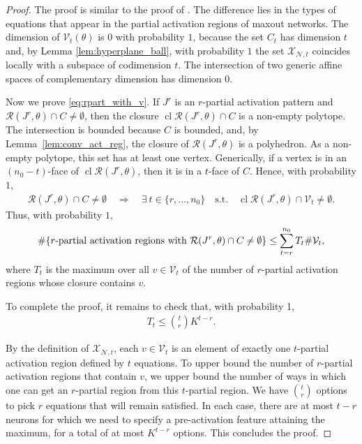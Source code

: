 \documentclass{article}
\theoremstyle{definition}
\newcommand{\net}{\mathcal{N}}
\newcommand{\nin}{n_0}
\begin{document}
\begin{proof} 
    The proof is similar to the proof of \cite[Lemma 12]{NIPS2019_8328}. The difference lies in the types of equations that appear in the partial activation regions of maxout networks.
    The dimension of $\mathcal{V}_t(\theta)$ is $0$ with probability $1$, because the set $C_t$ has dimension $t$ and, by Lemma \ref{lem:hyperplane_ball}, with probability $1$ the set $\mathcal{X}_{\net, t}$ coincides locally with a subspace of codimension $t$. 
    The intersection of two generic affine spaces of complementary dimension has dimension $0$. 
    
    Now we prove \eqref{eq:rpart_with_v}. 
    If $J^r$ is an $r$-partial activation pattern and $\mathcal{R}(J^r,\theta)\cap C\neq\emptyset$, then the closure $\operatorname{cl} \mathcal{R}(J^r,\theta) \cap C$ is a non-empty polytope.
    The intersection is bounded because $C$ is bounded, and, by Lemma~\ref{lem:conv_act_reg}, the closure of $\mathcal{R}(J^r,\theta)$ is a polyhedron. 
    As a non-empty polytope, this set has at least one vertex.
    Generically, if a vertex is in an $(\nin-t)$-face of $\operatorname{cl}\mathcal{R}(J^r,\theta)$, then it is in a $t$-face of $C$. 
    Hence, with probability $1$,  
    \begin{align*}
        \mathcal{R}(J^r,\theta) \cap C \neq \emptyset \quad \Rightarrow \quad \exists \ t \in \{r, \dots, \nin\} \quad \text{s.t.} \quad \operatorname{cl}\mathcal{R}(J^r,\theta) \cap \mathcal{V}_t \neq \emptyset. 
    \end{align*}
    Thus, with probability $1$,
    \begin{align*}
    \# \{ r\text{\normalfont -partial activation regions with } \mathcal{R}(J^r,\theta) \cap C \neq \emptyset\} \leq \sum\limits_{t = r}^{\nin} T_t \# \mathcal{V}_t,
    \end{align*}
    where $T_t$ is the maximum over all $v \in \mathcal{V}_t$ of the number of $r$-partial activation regions whose closure contains $v$.
    
    To complete the proof, it remains to check that, with probability 1, 
    \begin{align*}
        T_t\leq \binom{t}{r} K^{t-r}.
    \end{align*}
    
    By the definition of $\mathcal{X}_{\mathcal{N},t}$, each $v\in \mathcal{V}_t$ is an element of exactly one $t$-partial activation region defined by $t$ equations. 
    To upper bound the number of $r$-partial activation regions that contain $v$, we upper bound the number of ways in which one can get an $r$-partial region from this $t$-partial region. 
    We have $\binom{t}{r}$ options to pick $r$ equations that will remain satisfied. 
    In each case, there are at most $t-r$ neurons for which we need to specify a pre-activation feature attaining the maximum, for a total of at most $K^{t-r}$ options. 
    This concludes the proof. 
\end{proof}
\end{document}
